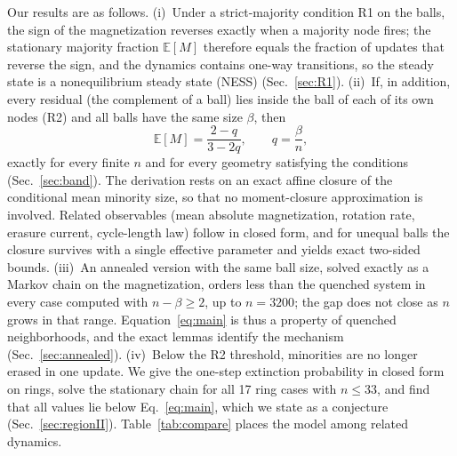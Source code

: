 \documentclass[aps,pre,reprint,superscriptaddress,amsmath,amssymb,longbibliography]{revtex4-2}
\theoremstyle{remark}
\newcommand{\E}{\mathbb{E}}
\begin{document}
Our results are as follows.
(i)~Under a strict-majority condition R1 on the balls, the sign of the
magnetization reverses exactly when a majority node fires; the
stationary majority fraction $\E[M]$ therefore equals the fraction of
updates that reverse the sign, and the dynamics contains one-way
transitions, so the steady state is a nonequilibrium steady state (NESS)
(Sec.~\ref{sec:R1}).
(ii)~If, in addition, every residual (the complement of a ball) lies
inside the ball of each of its own nodes (R2) and all balls have the
same size $\beta$, then
\begin{equation}
\E[M]=\frac{2-q}{3-2q},\qquad q=\frac{\beta}{n},
\label{eq:main}
\end{equation}
exactly for every finite $n$ and for every geometry satisfying the
conditions (Sec.~\ref{sec:band}). The derivation rests on an exact
affine closure of the conditional mean minority size, so that no
moment-closure approximation is involved. Related observables (mean
absolute magnetization, rotation rate, erasure current, cycle-length
law) follow in closed form, and for unequal balls the closure survives
with a single effective parameter and yields exact two-sided bounds.
(iii)~An annealed version with the same ball size, solved exactly as a
Markov chain on the magnetization, orders less than the quenched system
in every case computed with $n-\beta\ge2$, up to $n=3200$; the gap does not close as $n$
grows in that range. Equation~\eqref{eq:main} is thus a property of
quenched neighborhoods, and the exact lemmas identify the mechanism
(Sec.~\ref{sec:annealed}).
(iv)~Below the R2 threshold, minorities are no longer erased in one
update. We give the one-step extinction probability in closed form on
rings, solve the stationary chain for all 17 ring cases with $n\le33$,
and find that all values lie below Eq.~\eqref{eq:main}, which we state
as a conjecture (Sec.~\ref{sec:regionII}).
Table~\ref{tab:compare} places the model among related dynamics.
\end{document}
